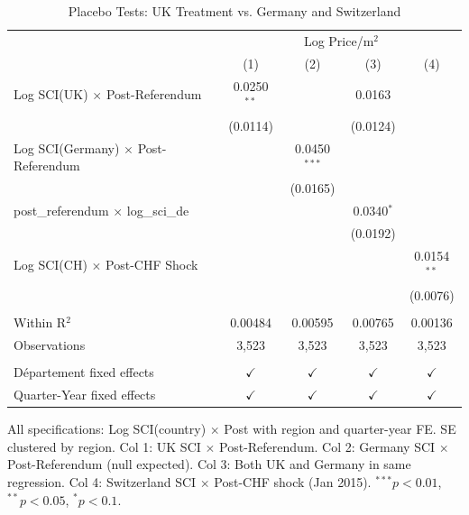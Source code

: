 
\begin{table}[htbp]
   \caption{\label{tab:placebo} Placebo Tests: UK Treatment vs. Germany and Switzerland}
   \bigskip
   \centering
   \begin{tabular}{lcccc}
      \toprule
       & \multicolumn{4}{c}{Log Price/m$^2$}\\
                                                 & (1)           & (2)            & (3)           & (4)\\  
      \midrule 
      Log SCI(UK) $\times$ Post-Referendum       & 0.0250$^{**}$ &                & 0.0163        &   \\   
                                                 & (0.0114)      &                & (0.0124)      &   \\   
      Log SCI(Germany) $\times$ Post-Referendum  &               & 0.0450$^{***}$ &               &   \\   
                                                 &               & (0.0165)       &               &   \\   
      post\_referendum $\times$ log\_sci\_de     &               &                & 0.0340$^{*}$  &   \\   
                                                 &               &                & (0.0192)      &   \\   
      Log SCI(CH) $\times$ Post-CHF Shock        &               &                &               & 0.0154$^{**}$\\   
                                                 &               &                &               & (0.0076)\\   
       \\
      Within R$^2$                               & 0.00484       & 0.00595        & 0.00765       & 0.00136\\  
      Observations                               & 3,523         & 3,523          & 3,523         & 3,523\\  
       \\
      D\'{e}partement fixed effects              & $\checkmark$  & $\checkmark$   & $\checkmark$  & $\checkmark$\\   
      Quarter-Year fixed effects                 & $\checkmark$  & $\checkmark$   & $\checkmark$  & $\checkmark$\\   
      \bottomrule
   \end{tabular}
   
   \par \raggedright 
   All specifications: Log SCI(country) $\times$ Post with region and quarter-year FE. SE clustered by region. Col 1: UK SCI $\times$ Post-Referendum. Col 2: Germany SCI $\times$ Post-Referendum (null expected). Col 3: Both UK and Germany in same regression. Col 4: Switzerland SCI $\times$ Post-CHF shock (Jan 2015). $^{***}p<0.01$, $^{**}p<0.05$, $^{*}p<0.1$.
\end{table}


